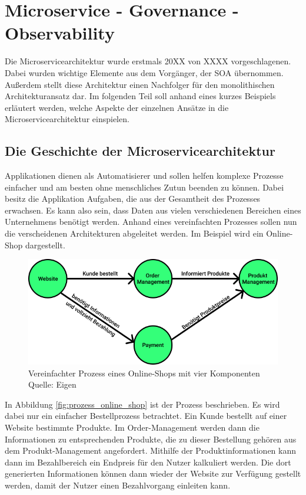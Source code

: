 \chapter{Microservice - Governance - Observability}

Die Microservicearchitektur wurde erstmals 20XX von XXXX  vorgeschlagenen. Dabei wurden wichtige Elemente aus dem Vorgänger, der \ac{SOA} übernommen. Außerdem stellt diese Architektur einen Nachfolger für den monolithischen Architekturansatz dar. Im folgenden Teil soll anhand eines kurzes Beispiels erläutert werden, welche Aspekte der einzelnen Ansätze in die Microservicearchitektur einspielen.

\section{Die Geschichte der Microservicearchitektur}

Applikationen dienen als Automatisierer und sollen helfen komplexe Prozesse einfacher und am besten ohne menschliches Zutun beenden zu können. Dabei besitz die Applikation Aufgaben, die aus der Gesamtheit des Prozesses erwachsen. Es kann also sein, dass Daten aus vielen verschiedenen Bereichen eines Unternehmens benötigt werden. Anhand eines vereinfachten Prozesses sollen nun die verscheidenen Architekturen abgeleitet werden. Im Beispiel wird ein Online-Shop dargestellt.

\begin{figure}[h]
	\centering
	\includegraphics[width=1.0\linewidth]{img/prozess_eCommernce.png}
	\caption[Prozess Online-Shop]{Vereinfachter Prozess eines Online-Shops mit vier Komponenten\\ Quelle: Eigen}
	\label{fig:prozess_online_shop}
\end{figure}

In Abbildung \vref{fig:prozess_online_shop} ist der Prozess beschrieben. Es wird dabei nur ein einfacher Bestellprozess betrachtet. Ein Kunde bestellt auf einer Website bestimmte Produkte. Im Order-Management werden dann die Informationen zu entsprechenden Produkte, die zu dieser Bestellung gehören aus dem Produkt-Management angefordert. Mithilfe der Produktinformationen kann dann im Bezahlbereich ein Endpreis für den Nutzer kalkuliert werden. Die dort generierten Informationen können dann wieder der Website zur Verfügung gestellt werden, damit der Nutzer einen Bezahlvorgang einleiten kann.

